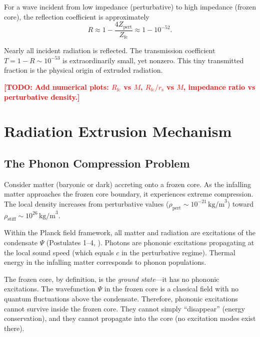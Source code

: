 \documentclass[12pt,a4paper]{article}
\newcommand{\TODO}[1]{\textcolor{red}{\textbf{[TODO: #1]}}}
\newcommand{\planckfield}{\Psi}
\newcommand{\rhostiff}{\rho_\text{stiff}}
\newcommand{\Rfc}{R_\text{fc}}
\newcommand{\Zfc}{Z_\text{fc}}
\newcommand{\Zpert}{Z_\text{pert}}
\theoremstyle{definition}
\begin{document}
For a wave incident from low impedance (perturbative) to high impedance (frozen core), the reflection coefficient is approximately
\begin{equation}
R \approx 1 - \frac{4\Zpert}{\Zfc} \approx 1 - 10^{-52}.
\label{eq:reflection_coefficient}
\end{equation}

Nearly all incident radiation is reflected. The transmission coefficient $T = 1 - R \sim 10^{-53}$ is extraordinarily small, yet nonzero. This tiny transmitted fraction is the physical origin of extruded radiation.

\TODO{Add numerical plots: $\Rfc$ vs $M$, $\Rfc/r_\text{s}$ vs $M$, impedance ratio vs perturbative density.}

\section{Radiation Extrusion Mechanism}
\label{sec:extrusion_mechanism}

\subsection{The Phonon Compression Problem}
\label{subsec:phonon_compression}

Consider matter (baryonic or dark) accreting onto a frozen core. As the infalling matter approaches the frozen core boundary, it experiences extreme compression. The local density increases from perturbative values ($\rho_\text{pert} \sim 10^{-21}\,\text{kg/m}^3$) toward $\rhostiff \sim 10^{26}\,\text{kg/m}^3$.

Within the Planck field framework, all matter and radiation are excitations of the condensate $\planckfield$ (Postulates 1--4, \cite{PlanckFieldI}). Photons are phononic excitations propagating at the local sound speed (which equals $c$ in the perturbative regime). Thermal energy in the infalling matter corresponds to phonon populations.

The frozen core, by definition, is the \emph{ground state}—it has no phononic excitations. The wavefunction $\planckfield$ in the frozen core is a classical field with no quantum fluctuations above the condensate. Therefore, phononic excitations cannot survive inside the frozen core. They cannot simply ``disappear'' (energy conservation), and they cannot propagate into the core (no excitation modes exist there).
\end{document}
